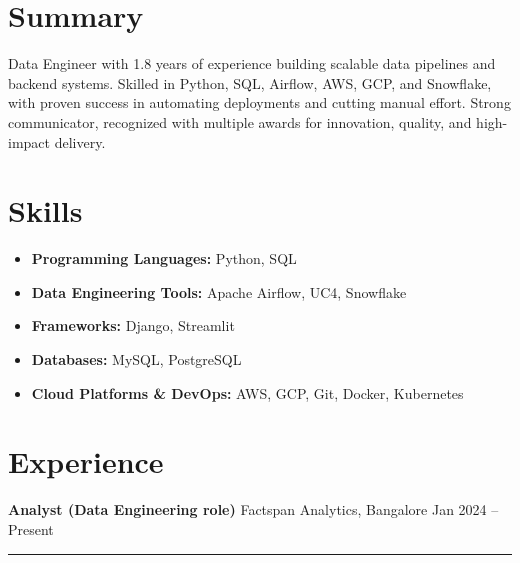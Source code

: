 


\section*{Summary}
Data Engineer with 1.8 years of experience building scalable data pipelines and backend systems. Skilled in Python, SQL, Airflow, AWS, GCP, and Snowflake, with proven success in automating deployments and cutting manual effort. Strong communicator, recognized with multiple awards for innovation, quality, and high-impact delivery.
\section*{Skills}
\begin{itemize}[leftmargin=0.5cm, label={}]
    \item \textbf{Programming Languages:} Python, SQL
    \item \textbf{Data Engineering Tools:} Apache Airflow, UC4, Snowflake
    \item \textbf{Frameworks:} Django, Streamlit
    \item \textbf{Databases:} MySQL, PostgreSQL
    \item \textbf{Cloud Platforms \& DevOps:} AWS, GCP, Git, Docker, Kubernetes
\end{itemize}


\section*{Experience}

\textbf{Analyst (Data Engineering role)} \hfill Factspan Analytics, Bangalore \hfill Jan 2024 – Present
\vspace{0.2cm}
\hrule
\vspace{0.2cm}

